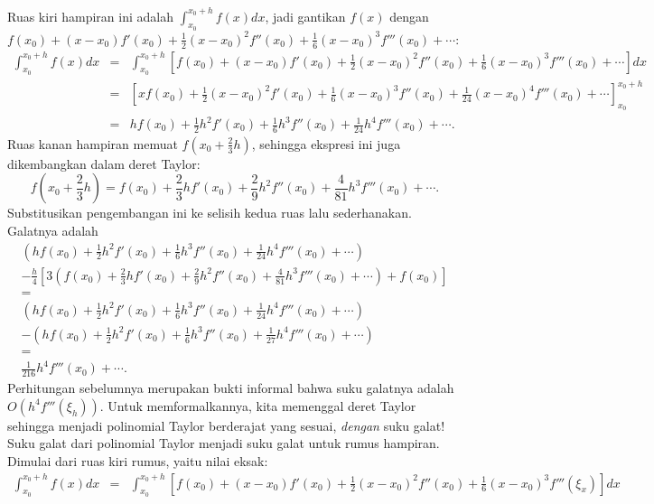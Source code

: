 \begin{description}
Ruas kiri hampiran ini adalah $\int_{x_{0}}^{x_{0}+h}f(x)dx$, jadi
gantikan $f(x)$ dengan $f(x_{0})+(x-x_{0})f'(x_{0})+\frac{1}{2}(x-x_{0})^{2}f''(x_{0})+\frac{1}{6}(x-x_{0})^{3}f'''(x_{0})+\cdots$:
\begin{eqnarray*}
\int_{x_{0}}^{x_{0}+h}f(x)dx & = & \int_{x_{0}}^{x_{0}+h}\left[f(x_{0})+(x-x_{0})f'(x_{0})+\frac{1}{2}(x-x_{0})^{2}f''(x_{0})+\frac{1}{6}(x-x_{0})^{3}f'''(x_{0})+\cdots\right]dx\\
 & = & \left[xf(x_{0})+\frac{1}{2}(x-x_{0})^{2}f'(x_{0})+\frac{1}{6}(x-x_{0})^{3}f''(x_{0})+\frac{1}{24}(x-x_{0})^{4}f'''(x_{0})+\cdots\right]_{x_{0}}^{x_{0}+h}\\
 & = & hf(x_{0})+\frac{1}{2}h^{2}f'(x_{0})+\frac{1}{6}h^{3}f''(x_{0})+\frac{1}{24}h^{4}f'''(x_{0})+\cdots.
\end{eqnarray*}
Ruas kanan hampiran memuat $f(x_{0}+\frac{2}{3}h)$, sehingga ekspresi
ini juga dikembangkan dalam deret Taylor:
\[
f\left(x_{0}+\frac{2}{3}h\right)=f(x_{0})+\frac{2}{3}hf'(x_{0})+\frac{2}{9}h^{2}f''(x_{0})+\frac{4}{81}h^{3}f'''(x_{0})+\cdots.
\]
Substitusikan pengembangan ini ke selisih kedua ruas lalu sederhanakan.
Galatnya adalah
\[
\begin{gathered}\left(hf(x_{0})+\frac{1}{2}h^{2}f'(x_{0})+\frac{1}{6}h^{3}f''(x_{0})+\frac{1}{24}h^{4}f'''(x_{0})+\cdots\right)\\
-\frac{h}{4}\left[3\left(f(x_{0})+\frac{2}{3}hf'(x_{0})+\frac{2}{9}h^{2}f''(x_{0})+\frac{4}{81}h^{3}f'''(x_{0})+\cdots\right)+f(x_{0})\right]\\
=\\
\left(hf(x_{0})+\frac{1}{2}h^{2}f'(x_{0})+\frac{1}{6}h^{3}f''(x_{0})+\frac{1}{24}h^{4}f'''(x_{0})+\cdots\right)\\
-\left(hf(x_{0})+\frac{1}{2}h^{2}f'(x_{0})+\frac{1}{6}h^{3}f''(x_{0})+\frac{1}{27}h^{4}f'''(x_{0})+\cdots\right)\\
=\\
\frac{1}{216}h^{4}f'''(x_{0})+\cdots.
\end{gathered}
\]
Perhitungan sebelumnya merupakan bukti informal bahwa suku galatnya
adalah $O(h^{4}f'''(\xi_{h}))$. Untuk memformalkannya, kita memenggal
deret Taylor sehingga menjadi polinomial Taylor berderajat yang sesuai,
\textit{dengan} suku galat! Suku galat dari polinomial Taylor menjadi
suku galat untuk rumus hampiran. Dimulai dari ruas kiri rumus, yaitu
nilai eksak:
\begin{eqnarray*}
\int_{x_{0}}^{x_{0}+h}f(x)dx & = & \int_{x_{0}}^{x_{0}+h}\left[f(x_{0})+(x-x_{0})f'(x_{0})+\frac{1}{2}(x-x_{0})^{2}f''(x_{0})+\frac{1}{6}(x-x_{0})^{3}f'''(\xi_{x})\right]dx\\

\end{eqnarray*}
\end{description}
